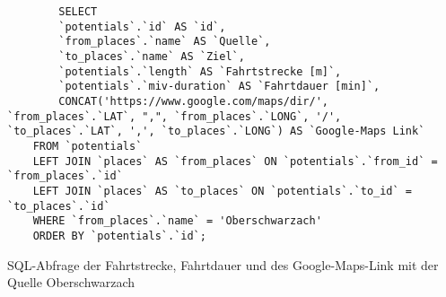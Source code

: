 \begin{listing}[htbp]
    \begin{verbatim}
        SELECT 
        `potentials`.`id` AS `id`, 
        `from_places`.`name` AS `Quelle`,
        `to_places`.`name` AS `Ziel`, 
        `potentials`.`length` AS `Fahrtstrecke [m]`, 
        `potentials`.`miv-duration` AS `Fahrtdauer [min]`,
        CONCAT('https://www.google.com/maps/dir/', `from_places`.`LAT`, ",", `from_places`.`LONG`, '/', `to_places`.`LAT`, ',', `to_places`.`LONG`) AS `Google-Maps Link`
    FROM `potentials`
    LEFT JOIN `places` AS `from_places` ON `potentials`.`from_id` = `from_places`.`id`
    LEFT JOIN `places` AS `to_places` ON `potentials`.`to_id` = `to_places`.`id`
    WHERE `from_places`.`name` = 'Oberschwarzach'
    ORDER BY `potentials`.`id`;
    \end{verbatim}
    \caption{SQL-Abfrage der Fahrtstrecke, Fahrtdauer und des Google-Maps-Link mit der Quelle Oberschwarzach}\label{lst-f-oberschwarzach}
\end{listing}